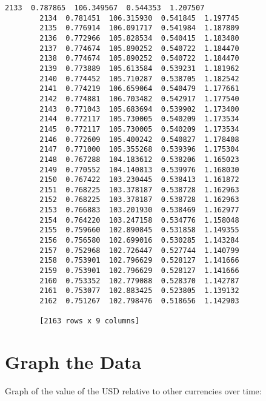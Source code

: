 \documentclass[11pt]{article}
\begin{document}
\begin{Verbatim}[commandchars=\\\{\}]
        2133  0.787865  106.349567  0.544353  1.207507  
        2134  0.781451  106.315930  0.541845  1.197745  
        2135  0.776914  106.091717  0.541984  1.187809  
        2136  0.772966  105.828534  0.540415  1.183480  
        2137  0.774674  105.890252  0.540722  1.184470  
        2138  0.774674  105.890252  0.540722  1.184470  
        2139  0.773889  105.613584  0.539231  1.181962  
        2140  0.774452  105.710287  0.538705  1.182542  
        2141  0.774219  106.659064  0.540479  1.177661  
        2142  0.774881  106.703482  0.542917  1.177540  
        2143  0.771043  105.683694  0.539902  1.173400  
        2144  0.772117  105.730005  0.540209  1.173534  
        2145  0.772117  105.730005  0.540209  1.173534  
        2146  0.772609  105.400242  0.540827  1.178408  
        2147  0.771000  105.355268  0.539396  1.175304  
        2148  0.767288  104.183612  0.538206  1.165023  
        2149  0.770552  104.140813  0.539976  1.168030  
        2150  0.767422  103.230445  0.538413  1.161872  
        2151  0.768225  103.378187  0.538728  1.162963  
        2152  0.768225  103.378187  0.538728  1.162963  
        2153  0.766883  103.201930  0.538469  1.162977  
        2154  0.764220  103.247158  0.534776  1.158048  
        2155  0.759660  102.890845  0.531858  1.149355  
        2156  0.756580  102.699016  0.530285  1.143284  
        2157  0.752968  102.726447  0.527744  1.140799  
        2158  0.753901  102.796629  0.528127  1.141666  
        2159  0.753901  102.796629  0.528127  1.141666  
        2160  0.753352  102.779088  0.528370  1.142787  
        2161  0.753077  102.883425  0.523805  1.139132  
        2162  0.751267  102.798476  0.518656  1.142903  
        
        [2163 rows x 9 columns]
\end{Verbatim}
            
    \section{Graph the Data}\label{graph-the-data}

Graph of the value of the USD relative to other currencies over time:
\end{document}
